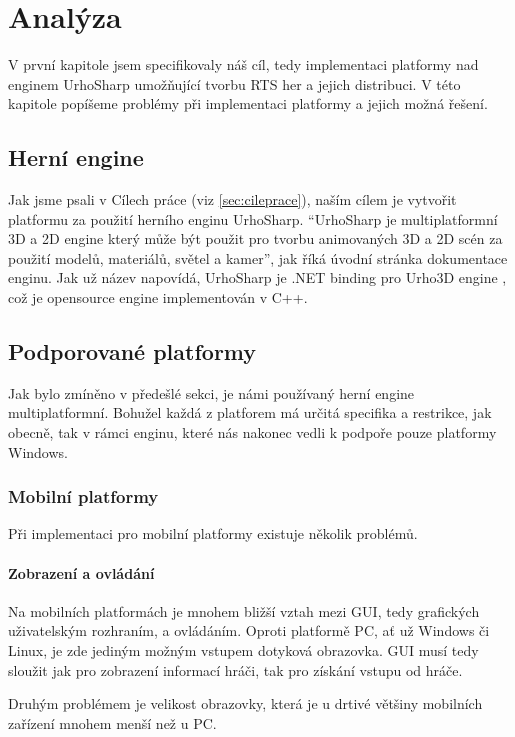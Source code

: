 \chapter{Analýza}
V první kapitole jsem specifikovaly náš cíl, tedy implementaci platformy nad enginem UrhoSharp umožňující tvorbu RTS her a jejich distribuci. V této kapitole popíšeme problémy při implementaci platformy a jejich možná řešení.

\section{Herní engine}
Jak jsme psali v Cílech práce (viz \ref{sec:cileprace}), naším cílem je vytvořit platformu za použití herního enginu UrhoSharp. ``UrhoSharp je multiplatformní 3D a 2D engine který může být použit pro tvorbu animovaných 3D a 2D scén za použití modelů, materiálů, světel a kamer''\citep{site:urhosharp}, jak říká úvodní stránka dokumentace enginu. Jak už název napovídá, UrhoSharp je .NET binding pro Urho3D engine \citep{site:urho3D}, což je opensource engine implementován v C++.


\section{Podporované platformy}
Jak bylo zmíněno v předešlé sekci, je námi používaný herní engine multiplatformní. Bohužel každá z platforem má určitá specifika a restrikce, jak obecně, tak v rámci enginu, které nás nakonec vedli k podpoře pouze platformy Windows. 

\subsection{Mobilní platformy}
Při implementaci pro mobilní platformy existuje několik problémů.

\subsubsection{Zobrazení a ovládání}
Na mobilních platformách je mnohem bližší vztah mezi GUI, tedy grafických uživatelským rozhraním, a ovládáním. Oproti platformě PC, ať už Windows či Linux, je zde jediným možným vstupem dotyková obrazovka. GUI musí tedy sloužit jak pro zobrazení informací hráči, tak pro získání vstupu od hráče. 

Druhým problémem je velikost obrazovky, která je u drtivé většiny mobilních zařízení mnohem menší než u PC. 

